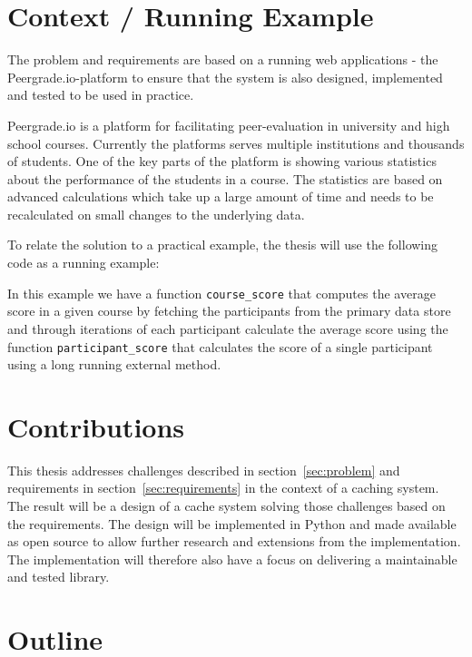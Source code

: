 \section{Context / Running Example}
\label{sec:context}

The problem and requirements are based on a running web applications - the Peergrade.io-platform to ensure that the system is also designed, implemented and tested to be used in practice.

Peergrade.io is a platform for facilitating peer-evaluation in university and high school courses. Currently the platforms serves multiple institutions and thousands of students. One of the key parts of the platform is showing various statistics about the performance of the students in a course. The statistics are based on advanced calculations which take up a large amount of time and needs to be recalculated on small changes to the underlying data.

To relate the solution to a practical example, the thesis will use the following code as a running example:



In this example we have a function \verb$course_score$ that computes the average score in a given course by fetching the participants from the primary data store and through iterations of each participant calculate the average score using the function \verb$participant_score$ that calculates the score of a single participant using a long running external method.



\section{Contributions}
\label{sec:contributions}

This thesis addresses challenges described in section~\ref{sec:problem} and requirements in section~\ref{sec:requirements} in the context of a caching system. The result will be a design of a cache system solving those challenges based on the requirements. The design will be implemented in Python  and made available as open source to allow further research and extensions from the implementation. The implementation will therefore also have a focus on delivering a maintainable and tested library.


\section{Outline}
\label{sec:outline}





